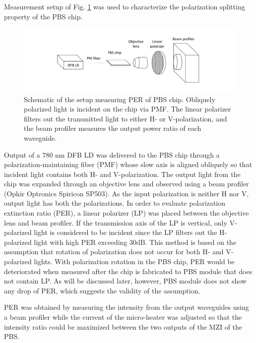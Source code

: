 \documentclass[letterpaper, 10pt]{article}
\begin{document}
Measurement setup of Fig. \ref{fig:setup}  was used to characterize the polarization splitting property of the PBS chip.
\begin{figure}
  \centering
  \includegraphics[width=13cm]{./setup.pdf}
  \caption{Schematic of the setup measuring PER of PBS chip. Obliquely polarized light is incident on the chip via PMF. The linear polarizer filters out the transmitted light to either H- or V-polarization, and the beam profiler measures the output power ratio of each waveguide.}
  \label{fig:setup}
\end{figure}
Output of a 780 nm DFB LD was delivered to the PBS chip through a polarization-maintaining fiber (PMF) whose slow axis is aligned obliquely so that incident light contains both H- and V-polarization.
The output light from the chip was expanded through an objective lens and observed using a beam profiler (Ophir Optronics Spiricon SP503).
As the input polarization is neither H nor V, output light has both the polarizations.
In order to evaluate polarization extinction ratio (PER), a linear polarizer (LP) was placed between the objective lens and beam profiler.
If the transmission axis of the LP is vertical, only V-polarized light is considered to be incident since the LP filters out the H-polarized light with high PER exceeding 30dB.
This method is based on the assumption that rotation of polarization does not occur for both H- and V-polarized lights.
With polarization rotation in the PBS chip, PER would be deteriorated when measured after the chip is fabricated to PBS module that does not contain LP.
As will be discussed later, however, PBS module does not show any drop of PER, which suggests the validity of the assumption.

PER was obtained by measuring the intensity from the output waveguides using a beam profiler while the current of the micro-heater was adjusted so that the intensity ratio could be maximized  between the two outputs of the MZI of the PBS.
\end{document}
